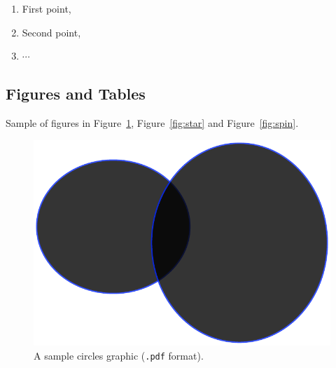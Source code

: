 \documentclass[article,english]{stucosrec}
\begin{document}
	\begin{enumerate}
	    \item First point,
	    \item Second point,
	    \item $\cdots$
	\end{enumerate}
    
    \subsection{Figures and Tables}
    
    Sample of figures in Figure~\ref{fig:circles}, Figure~\ref{fig:star} and Figure~\ref{fig:spin}.
    
    \begin{figure}
		\centering
		\includegraphics[scale=0.5]{circles.pdf}
		\caption{A sample circles graphic (\texttt{.pdf} format).}
		\label{fig:circles}
	\end{figure}
	
\end{document}
